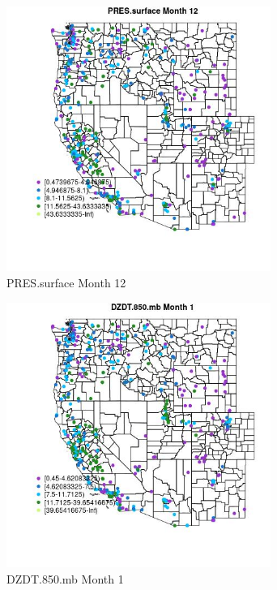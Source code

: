 \begin{figure} 
\centering  
\includegraphics[width=0.77\textwidth]{Code_Outputs/ML_input_report_ML_input_PM25_Step5_part_d_de_duplicated_aves_ML_input_MapObsMo12PRESsurface.jpg} 
\caption{\label{fig:ML_input_report_ML_input_PM25_Step5_part_d_de_duplicated_aves_ML_inputMapObsMo12PRESsurface}PRES.surface Month 12} 
\end{figure} 
 

\begin{figure} 
\centering  
\includegraphics[width=0.77\textwidth]{Code_Outputs/ML_input_report_ML_input_PM25_Step5_part_d_de_duplicated_aves_ML_input_MapObsMo1DZDT850mb.jpg} 
\caption{\label{fig:ML_input_report_ML_input_PM25_Step5_part_d_de_duplicated_aves_ML_inputMapObsMo1DZDT850mb}DZDT.850.mb Month 1} 
\end{figure} 
 

